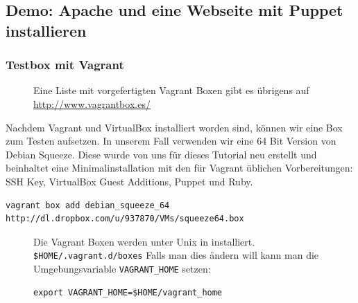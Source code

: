 \documentclass[12pt,a4paper,ngerman]{article}
\begin{document}
\subsection{Demo: Apache und eine Webseite mit Puppet installieren}

\subsubsection{Testbox mit Vagrant}

\begin{figure}
\vspace{-15pt}
\begin{boxedminipage}{5cm}
Eine Liste mit vorgefertigten Vagrant Boxen gibt es übrigens auf \url{http://www.vagrantbox.es/}
\end{boxedminipage}
\end{figure}

Nachdem Vagrant und VirtualBox installiert worden sind, können wir eine Box zum Testen aufsetzen. In unserem Fall verwenden wir eine 64 Bit Version von Debian Squeeze. Diese wurde von uns für dieses Tutorial neu erstellt und beinhaltet eine Minimalinstallation mit den für Vagrant üblichen Vorbereitungen: SSH Key, VirtualBox Guest Additions, Puppet und Ruby.

\begin{lstlisting}[caption=Download der Vagrant Box, label=vagrant-add]
vagrant box add debian_squeeze_64 http://dl.dropbox.com/u/937870/VMs/squeeze64.box
\end{lstlisting}

\begin{figure}
\vspace{-20pt}
\begin{boxedminipage}{6cm}
 Die Vagrant Boxen werden unter Unix in installiert. \lstinline!$HOME/.vagrant.d/boxes!
Falls man dies ändern will kann man die Umgebungsvariable \lstinline$VAGRANT_HOME$ setzen:
\begin{lstlisting}[label=vagrant-home,frame=none,numbers=none]
export VAGRANT_HOME=$HOME/vagrant_home
\end{lstlisting}
\end{boxedminipage}
\end{figure}
  
\end{document}
